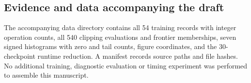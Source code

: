 \FloatBarrier
\subsection{Evidence and data accompanying the draft}
\label{app:result-data}

The accompanying data directory contains all 54 training records with
integer operation counts, all 540 clipping evaluations and frontier
memberships, seven signed histograms with zero and tail counts, figure
coordinates, and the 30-checkpoint runtime reduction. A manifest records
source paths and file hashes. No additional training, diagnostic evaluation
or timing experiment was performed to assemble this manuscript.
